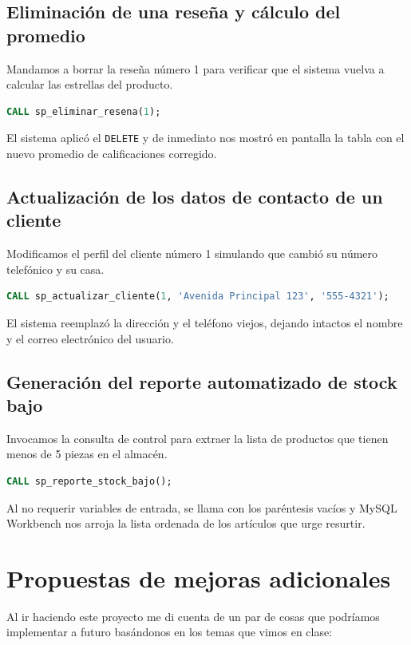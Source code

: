 \documentclass[10pt,letterpaper]{article}
\begin{document}
\subsection{Eliminaci\'on de una rese\~na y c\'alculo del promedio}
Mandamos a borrar la rese\~na n\'umero 1 para verificar que el sistema vuelva a calcular las estrellas del producto.
\begin{lstlisting}[language=SQL, frame=single, caption={Eliminaci\'on de rese\~na y recalculo de promedio}]
CALL sp_eliminar_resena(1);
\end{lstlisting}
El sistema aplic\'o el \texttt{DELETE} y de inmediato nos mostr\'o en pantalla la tabla con el nuevo promedio de calificaciones corregido.

\subsection{Actualizaci\'on de los datos de contacto de un cliente}
Modificamos el perfil del cliente n\'umero 1 simulando que cambi\'o su n\'umero telef\'onico y su casa.
\begin{lstlisting}[language=SQL, frame=single, caption={Actualizaci\'on de perfil de cliente}]
CALL sp_actualizar_cliente(1, 'Avenida Principal 123', '555-4321');
\end{lstlisting}
El sistema reemplaz\'o la direcci\'on y el tel\'efono viejos, dejando intactos el nombre y el correo electr\'onico del usuario.

\subsection{Generaci\'on del reporte automatizado de stock bajo}
Invocamos la consulta de control para extraer la lista de productos que tienen menos de 5 piezas en el almac\'en.
\begin{lstlisting}[language=SQL, frame=single, caption={Llamada al reporte de stock bajo}]
CALL sp_reporte_stock_bajo();
\end{lstlisting}
Al no requerir variables de entrada, se llama con los par\'entesis vac\'ios y MySQL Workbench nos arroja la lista ordenada de los art\'iculos que urge resurtir.


\section{Propuestas de mejoras adicionales}
Al ir haciendo este proyecto me di cuenta de un par de cosas que podr\'iamos implementar a futuro bas\'andonos en los temas que vimos en clase:
\end{document}
